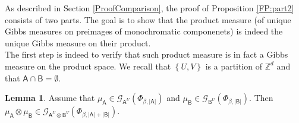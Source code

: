 \documentclass[12pt]{article}
\renewcommand{\AA}{\mathsf{A}}
\newcommand{\AB}{\mathsf{B}}
\newcommand{\G}{\mathcal{G}}
\newcommand{\Z}{\mathbb{Z}}
\newcommand{\set}[1]{\left\{#1\right\}}
\newcommand{\1}{\mathbbm{1}}
\newcommand{\5}{\vspace{0.5cm}}
\theoremstyle{definition}
\newtheorem{lem}[thm]{Lemma}
\begin{document}
As described in Section \ref{ProofComparison}, the proof of Proposition \ref{FP:part2} consists of two parts. The goal is to show that the product measure (of unique Gibbs measures on preimages of monochromatic componenets) is indeed the unique Gibbs measure on their product. \\

The first step is indeed to verify that such product measure is in fact a Gibbs measure on the product space. We recall that $\set{U,V}$ is a partition of $\Z^d$ and that $\AA\cap\AB=\emptyset$. 

\begin{lem}
Assume that $\mu_\AA\in\G_{\AA^U}(\Phi_{\beta,|\AA|})$ and $\mu_\AB\in\G_{\AB^U}(\Phi_{\beta,|\AB|})$. Then $\mu_\AA\otimes\mu_\AB\in\G_{\AA^U\otimes\AB^V}(\Phi_{\beta,|\AA|+|\AB|})$.
\end{lem}
\end{document}
